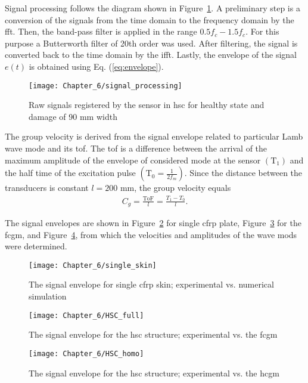 \documentclass[11pt,a4paper,final]{report}
\theoremstyle{plain}
\begin{document}
Signal processing follows the diagram shown in Figure~\ref{fig:signal_processing}.
A preliminary step is a conversion of the signals from the time domain to the frequency domain by the \ac{fft}.
Then, the band-pass filter is applied in the range \(0.5f_c-1.5f_c\).
For this purpose a Butterworth filter of 20th order was used.
After filtering, the signal is converted back to the time domain by the \ac{ifft}.
Lastly, the envelope of the signal \(e(t)\) is obtained using Eq. (\ref{eq:envelope}).

\begin{figure}[!htb]
	\begin{center}
		\texttt{[image: Chapter\_6/signal\_processing]}
	\end{center}
	\caption{Raw signals registered by the sensor in \acl{hsc} for healthy state and damage of 90 \unit{\mm} width}
	\label{fig:signal_processing}
\end{figure}

The group velocity is derived from the signal envelope related to particular Lamb wave mode and its \ac{tof}.
The \ac{tof} is a difference between the arrival of the maximum amplitude of the envelope of considered mode at the sensor \((\mathrm{T}_1)\) and the half time of the excitation pulse \(\left(\mathrm{T}_0=\frac{1}{2f_m}\right)\).
Since the distance between the transducers is constant \(l=200\) \unit{\mm}, the group velocity equals
\begin{eqnarray}
	C_g = \frac{\mathrm{ToF}}{l}=\frac{T_1-T_0}{l}.
\end{eqnarray}

The signal envelopes are shown in Figure~\ref{fig:single_skin} for single \ac{cfrp} plate, Figure~\ref{fig:hsc_full} for the \ac{fcgm}, and Figure~\ref{fig:hsc_homo}, from which the velocities and amplitudes of the wave mods were determined.
\begin{figure}[!htb]
	\begin{center}
		\texttt{[image: Chapter\_6/single\_skin]}
	\end{center}
	\caption{The signal envelope for single \acs{cfrp} skin; experimental vs. numerical simulation}
	\label{fig:single_skin}
\end{figure}
\begin{figure}[!htb]
	\begin{center}
		\texttt{[image: Chapter\_6/HSC\_full]}
	\end{center}
	\caption{The signal envelope for the \acl{hsc} structure; experimental vs. the \acf{fcgm}}
	\label{fig:hsc_full}
\end{figure}
\begin{figure}[!htb]
	\begin{center}
		\texttt{[image: Chapter\_6/HSC\_homo]}
	\end{center}
	\caption{The signal envelope for the \acl{hsc} structure; experimental vs. the \acf{hcgm}}
	\label{fig:hsc_homo}
\end{figure}
\end{document}
